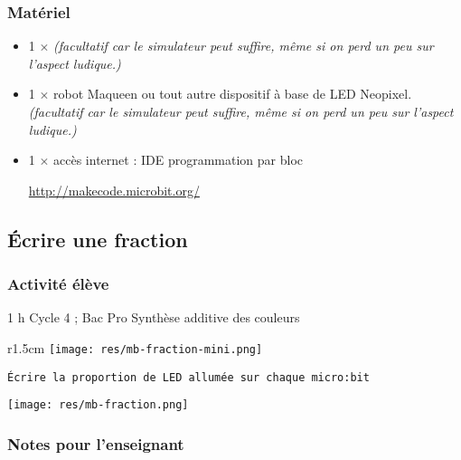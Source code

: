 \subsubsection{Matériel}
\begin{itemize}
    \item 1 $\times$ \matosMb \emph{(facultatif car le simulateur peut suffire, même si on perd un peu sur l'aspect ludique.)}
    \item 1 $\times$ robot Maqueen ou tout autre dispositif à base de LED Neopixel. \emph{(facultatif car le simulateur peut suffire, même si on perd un peu sur l'aspect ludique.)} 
    \item 1 $\times$ accès internet : IDE programmation par bloc
    
    \url{http://makecode.microbit.org/}
\end{itemize}



%
%
\newpage
\subsection{Écrire une fraction}
\subsubsection{Activité élève}

\cartouche
{1 h}
{Cycle 4 ; Bac Pro}
{}
{Synthèse additive des couleurs }
{}




%
%

\begin{wrapfigure}[1]{r}{1.5cm}
    \texttt{[image: res/mb-fraction-mini.png]}
\end{wrapfigure}




\begin{eleve}    
    \texttt{Écrire la proportion de LED allumée sur chaque micro:bit}
    
    \centerline{\texttt{[image: res/mb-fraction.png]}}
\end{eleve}

%
%

\subsubsection{Notes pour l'enseignant}

